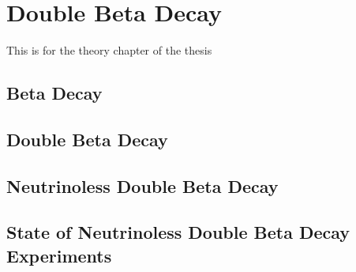 \chapter{Double Beta Decay}
\label{chap:Beta Decay}

This is for the theory chapter of the thesis
\section{Beta Decay}
\label{sec:Beta Decay}

\section{Double Beta Decay}


\section{Neutrinoless Double Beta Decay}

\section{State of Neutrinoless Double Beta Decay Experiments}